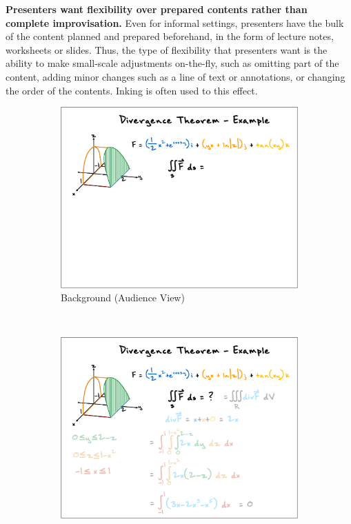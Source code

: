 \textbf{Presenters want flexibility over prepared contents rather than complete improvisation.} Even for informal settings, presenters have the bulk of the content planned and prepared beforehand, in the form of lecture notes, worksheets or slides. Thus, the type of flexibility that presenters want is the ability to make small-scale adjustments on-the-fly, such as omitting part of the content, adding minor changes such as a line of text or annotations, or changing the order of the contents. Inking is often used to this effect. 
\begin{figure}[ht!]
    \centering
    \begin{subfigure}[t]{0.32\textwidth}
        \centering
        \includegraphics[width=1\columnwidth]{figures/videoslide1}
        \caption{Background (Audience View)}
    \end{subfigure}%
    ~ 
    \begin{subfigure}[t]{0.32\textwidth}
        \centering
        \includegraphics[width=1\columnwidth]{figures/videoslide2}

\end{subfigure}
\end{figure}
